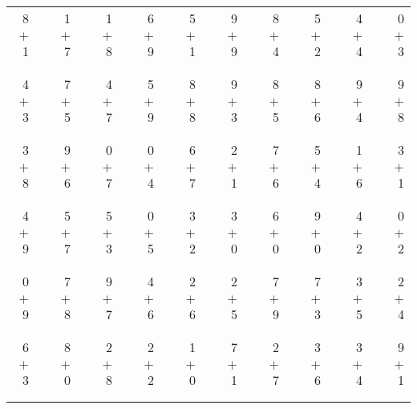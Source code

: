 \documentclass[12pt, letterpaper]{article}
\begin{document}
\begin{tabular}{rrrrrrrrrrrrrrrrrrr}
8 & & 1 & & 1 & & 6 & & 5 & & 9 & & 8 & & 5 & & 4 & & 0\\
$+$ 1 & & $+$ 7 & & $+$ 8 & & $+$ 9 & & $+$ 1 & & $+$ 9 & & $+$ 4 & & $+$ 2 & & $+$ 4 & & $+$ 3\\
\cline{1-1} \cline{3-3} \cline{5-5} \cline{7-7} \cline{9-9} \cline{11-11} \cline{13-13} \cline{15-15} \cline{17-17} \cline{19-19} \\ \\
4 & & 7 & & 4 & & 5 & & 8 & & 9 & & 8 & & 8 & & 9 & & 9\\
$+$ 3 & & $+$ 5 & & $+$ 7 & & $+$ 9 & & $+$ 8 & & $+$ 3 & & $+$ 5 & & $+$ 6 & & $+$ 4 & & $+$ 8\\
\cline{1-1} \cline{3-3} \cline{5-5} \cline{7-7} \cline{9-9} \cline{11-11} \cline{13-13} \cline{15-15} \cline{17-17} \cline{19-19} \\ \\
3 & & 9 & & 0 & & 0 & & 6 & & 2 & & 7 & & 5 & & 1 & & 3\\
$+$ 8 & & $+$ 6 & & $+$ 7 & & $+$ 4 & & $+$ 7 & & $+$ 1 & & $+$ 6 & & $+$ 4 & & $+$ 6 & & $+$ 1\\
\cline{1-1} \cline{3-3} \cline{5-5} \cline{7-7} \cline{9-9} \cline{11-11} \cline{13-13} \cline{15-15} \cline{17-17} \cline{19-19} \\ \\
4 & & 5 & & 5 & & 0 & & 3 & & 3 & & 6 & & 9 & & 4 & & 0\\
$+$ 9 & & $+$ 7 & & $+$ 3 & & $+$ 5 & & $+$ 2 & & $+$ 0 & & $+$ 0 & & $+$ 0 & & $+$ 2 & & $+$ 2\\
\cline{1-1} \cline{3-3} \cline{5-5} \cline{7-7} \cline{9-9} \cline{11-11} \cline{13-13} \cline{15-15} \cline{17-17} \cline{19-19} \\ \\
0 & & 7 & & 9 & & 4 & & 2 & & 2 & & 7 & & 7 & & 3 & & 2\\
$+$ 9 & & $+$ 8 & & $+$ 7 & & $+$ 6 & & $+$ 6 & & $+$ 5 & & $+$ 9 & & $+$ 3 & & $+$ 5 & & $+$ 4\\
\cline{1-1} \cline{3-3} \cline{5-5} \cline{7-7} \cline{9-9} \cline{11-11} \cline{13-13} \cline{15-15} \cline{17-17} \cline{19-19} \\ \\
6 & & 8 & & 2 & & 2 & & 1 & & 7 & & 2 & & 3 & & 3 & & 9\\
$+$ 3 & & $+$ 0 & & $+$ 8 & & $+$ 2 & & $+$ 0 & & $+$ 1 & & $+$ 7 & & $+$ 6 & & $+$ 4 & & $+$ 1\\
\cline{1-1} \cline{3-3} \cline{5-5} \cline{7-7} \cline{9-9} \cline{11-11} \cline{13-13} \cline{15-15} \cline{17-17} \cline{19-19} \\ \\

\end{tabular}
\end{document}
